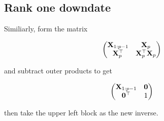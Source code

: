 \documentclass{amsart}
\begin{document}
\subsection{Rank one downdate}
Similiarly, form the matrix

\begin{equation*}
\begin{pmatrix}
{\bf X}_{1:p-1} & {\bf X}_p \\
{\bf X}_p^\top & {\bf X}_p^\top {\bf X}_p
\end{pmatrix}
\end{equation*}

and subtract outer products to get

\begin{equation*}
\begin{pmatrix}
{\bf X}_{1:p-1} & {\bf 0} \\
{\bf 0}^\top & 1
\end{pmatrix}
\end{equation*}

then take the upper left block as the new inverse.
\end{document}
